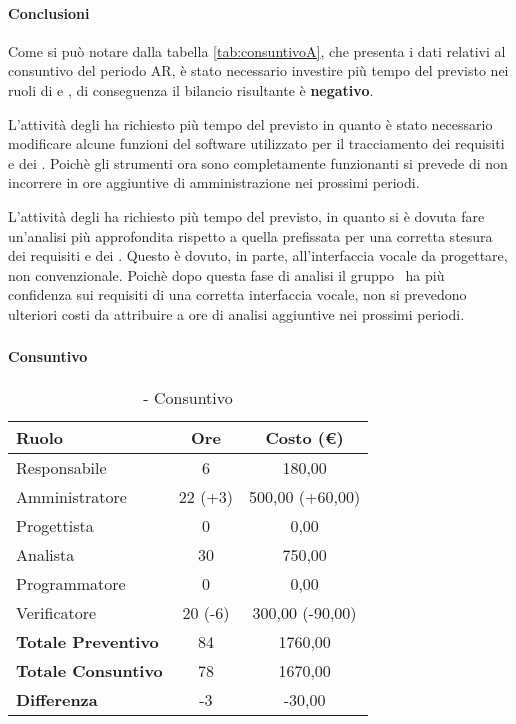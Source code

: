 \documentclass[./PianoDiProgetto.tex]{subfiles}
\begin{document}
  \paragraph{Conclusioni}
		Come si può notare dalla tabella \ref{tab:consuntivoA}, che presenta i dati relativi al consuntivo del periodo AR, è stato necessario investire più tempo del previsto nei ruoli di  \AMM{} e \AN, di conseguenza il bilancio risultante è \textbf{negativo}.
		
		L'attività degli \AMMP{} ha richiesto più tempo del previsto in quanto è stato necessario modificare alcune funzioni del software utilizzato per il tracciamento dei requisiti e dei . Poichè gli strumenti ora sono completamente funzionanti si prevede di non incorrere in ore aggiuntive di amministrazione nei prossimi periodi.
		
		L'attività degli \ANP{} ha richiesto più tempo del previsto, in quanto si è dovuta fare un'analisi più approfondita rispetto a quella prefissata per una corretta stesura dei requisiti e dei .
		Questo è dovuto, in parte, all'interfaccia vocale da progettare, non convenzionale.
		Poichè dopo questa fase di analisi il gruppo \GRUPPO\ ha più confidenza sui requisiti di una corretta interfaccia vocale, non si prevedono ulteriori costi da attribuire a ore di analisi aggiuntive nei prossimi periodi.

\subsubsection{\PerAD}
	\paragraph{Consuntivo}
	\begin{table}[h]
		\centering
		\begin{tabular}{l * {2}{c}}
			\toprule
			\textbf{Ruolo} & \textbf{Ore} & \textbf{Costo (\euro{})} \\
			\midrule
			Responsabile &	6 & 180,00 \\
			Amministratore & 22 (+3)  & 500,00 (+60,00)\\
			Progettista & 0 & 0,00 \\
			Analista & 30 & 750,00\\
			Programmatore & 0 & 0,00 \\
			Verificatore & 20 (-6) & 300,00 (-90,00)\\
			\midrule
			\textbf{Totale Preventivo} & 84
 & 1760,00
 \\		
			\textbf{Totale Consuntivo} & 78 & 1670,00
 \\
			\midrule
			\textbf{Differenza} & -3 & -30,00 \\
			\bottomrule
		\end{tabular}
		\caption{\PerAD{} - Consuntivo}
		
	\end{table}	
\end{document}
